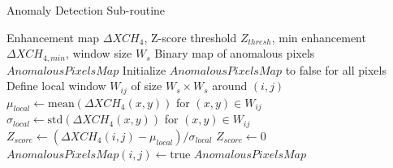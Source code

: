\documentclass[12pt,a4paper]{article}
\begin{document}
\begin{algorithm}[H]
\caption{Anomaly Detection Sub-routine}
\label{alg:anomaly_detection}
\begin{algorithmic}[1]
\REQUIRE Enhancement map $\Delta XCH_4$, Z-score threshold $Z_{thresh}$, min enhancement $\Delta XCH_{4,min}$, window size $W_s$
\ENSURE Binary map of anomalous pixels $AnomalousPixelsMap$
\STATE Initialize $AnomalousPixelsMap$ to false for all pixels
    \STATE Define local window $W_{ij}$ of size $W_s \times W_s$ around $(i,j)$
    \STATE $\mu_{local} \leftarrow \text{mean}(\Delta XCH_4(x,y))$ for $(x,y) \in W_{ij}$
    \STATE $\sigma_{local} \leftarrow \text{std}(\Delta XCH_4(x,y))$ for $(x,y) \in W_{ij}$
     
        \STATE $Z_{score} \leftarrow (\Delta XCH_4(i,j) - \mu_{local}) / \sigma_{local}$
    \ELSE
        \STATE $Z_{score} \leftarrow 0$ 
    \ENDIF
        \STATE $AnomalousPixelsMap(i,j) \leftarrow \text{true}$
    \ENDIF
\ENDFOR
\RETURN $AnomalousPixelsMap$
\end{algorithmic}
\end{algorithm}
\end{document}
